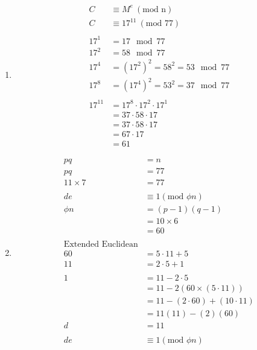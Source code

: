 \documentclass{assignment}
\begin{document}
\begin{problemlist}
\begin{problem}
\begin{answer}
\begin{enumerate}[label=(\alph*)]
	\item \begin{align*}
			C &\equiv M^{e} \: (\text{mod n}) \\
            C &\equiv 17^{11} \: (\text{mod 77}) \\ \\
            17^{1} &= 17 \mod 77 \\
            17^{2} &= 58 \mod 77 \\
            17^{4} &= (17^2)^2 = 58^2 = 53 \mod 77 \\
            17^{8} &= (17^4)^2 = 53^2 = 37 \mod 77 \\ \\
            17^{11} &= 17^8 \cdot 17^2 \cdot 17^1 \\ 
            		&= 37 \cdot 58 \cdot 17 \\
                    &= 37 \cdot 58 \cdot 17 \\
                    &= 67 \cdot 17 \\
                    &= 61
		  \end{align*}
	\item \begin{align*}
			pq &= n \\
            pq &= 77 \\
            11 \times 7 &= 77 \\ \\
            de &\equiv 1 (\text{mod $\phi n$}) \\
            \phi n &= (p-1)(q-1) \\
            &= 10 \times 6 \\
            &= 60 \\ \\
            \text{Extended Euclidean} \\
            60 &= 5 \cdot 11 + 5 \\
            11 &= 2 \cdot 5 + 1 \\ \\
            1 &= 11 - 2 \cdot 5 \\
            &= 11 - 2 (60 \times (5 \cdot 11)) \\
            &= 11 - (2 \cdot 60) + (10 \cdot 11) \\
            &= 11(11) - (2)(60) \\
         	d &= 11 \\ \\
            de &\equiv 1 (\text{mod $\phi n$}) \\

\end{align*}
\end{enumerate}
\end{answer}
\end{problem}
\end{problemlist}
\end{document}
